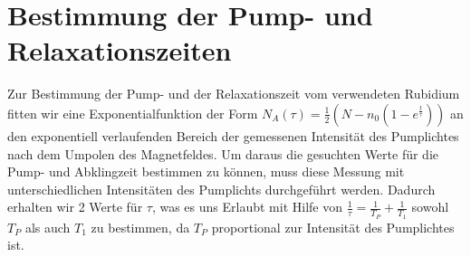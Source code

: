 \documentclass[bigchapter,colorback,accentcolor=tud4b,linedtoc,11pt]{tudreport}
\begin{document}
\section{Bestimmung der Pump- und Relaxationszeiten}
Zur Bestimmung der Pump- und der Relaxationszeit vom verwendeten Rubidium fitten
wir eine Exponentialfunktion der Form  $N_A(\tau) = \frac{1}{2} (N-n_0
(1-e^{\frac{t}{\tau}}))$ an den exponentiell verlaufenden Bereich der gemessenen
Intensität des Pumplichtes nach dem Umpolen des Magnetfeldes. Um daraus die
gesuchten Werte für die Pump- und Abklingzeit bestimmen zu können, muss diese
Messung mit unterschiedlichen Intensitäten des Pumplichts durchgeführt
werden. Dadurch erhalten wir 2 Werte für $\tau$, was es uns Erlaubt mit Hilfe
von $\frac{1}{\tau} = \frac{1}{T_P} + \frac{1}{T_1}$ sowohl $T_P$ als auch $T_1$
zu bestimmen, da $T_P$ proportional zur Intensität des Pumplichtes ist.
\end{document}

